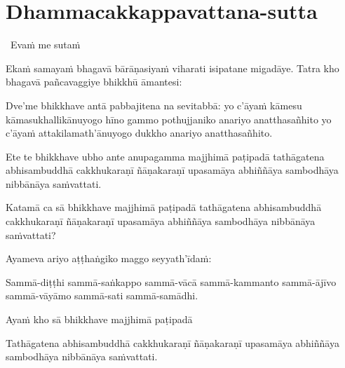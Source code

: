 \section{Dhammacakkappavattana-sutta}
\label{dhammacakkappavattana-full}

\begin{leader}
  \anglebracketleft\ \hspace{-0.5mm}Evaṁ me sutaṁ \hspace{-0.5mm}\anglebracketright\
\end{leader}

\begin{pali-hang}
  Ekaṁ samayaṁ bhagavā bārāṇasiyaṁ viharati isipatane migadāye. Tatra kho bhagavā pañcavaggiye bhikkhū āmantesi:
\end{pali-hang}

\begin{pali-hang}
  Dve'me bhikkhave antā pabbajitena na sevitabbā: yo c'āyaṁ kāmesu kāmasukhallikānuyogo hīno gammo pothujjaniko anariyo anatthasañhito yo c'āyaṁ attakilamath'ānuyogo dukkho anariyo anatthasañhito.
\end{pali-hang}

\begin{pali-hang}
  Ete te bhikkhave ubho ante anupagamma majjhimā paṭipadā tathāgatena abhisambuddhā cakkhukaraṇī ñāṇakaraṇī upasamāya abhiññāya sambodhāya nibbānāya saṁvattati.
\end{pali-hang}

\begin{pali-hang}
  Katamā ca sā bhikkhave majjhimā paṭipadā tathāgatena abhisambuddhā cakkhukaraṇī ñāṇakaraṇī upasamāya abhiññāya sambodhāya nibbānāya saṁvattati?
\end{pali-hang}

\begin{pali-hang}
  Ayameva ariyo aṭṭhaṅgiko maggo seyyath'īdaṁ:
\end{pali-hang}

\begin{pali-hang}
  Sammā-diṭṭhi sammā-saṅkappo sammā-vācā sammā-kammanto sammā-ājīvo sammā-vāyāmo sammā-sati sammā-samādhi.
\end{pali-hang}

\begin{pali-hang}
  Ayaṁ kho sā bhikkhave majjhimā paṭipadā
\end{pali-hang}

\begin{pali-hang}
  Tathāgatena abhisambuddhā cakkhukaraṇī ñāṇakaraṇī upasamāya abhiññāya sambodhāya nibbānāya saṁvattati.
\end{pali-hang}

